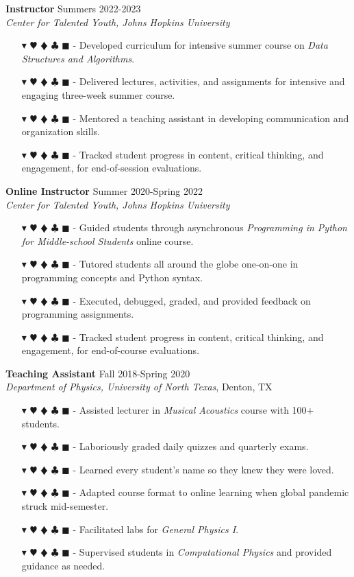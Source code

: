 \documentclass[overlapped, 10pt]{res} %
\newcommand{\physics}{$\blacktriangledown$}
\newcommand{\biochem}{$\varheartsuit$}
\newcommand{\shannon}{$\vardiamondsuit$}
\newcommand{\classic}{$\clubsuit$}
\newcommand{\quantum}{$\blacksquare$}
\newcommand{\physicscolor}{\color{YellowOrange}}
\newcommand{\biochemcolor}{\color{Emerald}}
\newcommand{\shannoncolor}{\color{Goldenrod}}
\newcommand{\classiccolor}{\color{Cyan}}
\newcommand{\quantumcolor}{\color{RedOrange}}
\newcommand{\tag}[1]{
    {\IfSubStr{#1}{\physics}{\physicscolor}{\color{White}}\physics}
    {\IfSubStr{#1}{\biochem}{\biochemcolor}{\color{White}}\biochem}
    {\IfSubStr{#1}{\shannon}{\shannoncolor}{\color{White}}\shannon}
    {\IfSubStr{#1}{\classic}{\classiccolor}{\color{White}}\classic}
    {\IfSubStr{#1}{\quantum}{\quantumcolor}{\color{White}}\quantum}
}
\begin{document}
\begin{resume}
\textbf{Instructor} \hfill Summers 2022-2023 \\
\textit{Center for Talented Youth, Johns Hopkins University}
\begin{itemize} \itemsep -2pt %
\item[\tag{\classic}-] Developed curriculum for intensive summer course on \textit{Data Structures and Algorithms}.
\item[\tag{\classic}-] Delivered lectures, activities, and assignments for intensive and engaging three-week summer course.
\item[\tag{}-] Mentored a teaching assistant in developing communication and organization skills.
\item[\tag{}-] Tracked student progress in content, critical thinking, and engagement, for end-of-session evaluations.
\end{itemize}

\textbf{Online Instructor} \hfill Summer 2020-Spring 2022 \\
\textit{Center for Talented Youth, Johns Hopkins University}
\begin{itemize} \itemsep -2pt %
\item[\tag{\classic}-] Guided students through asynchronous \textit{Programming in Python for Middle-school Students} online course.
\item[\tag{\classic}-] Tutored students all around the globe one-on-one in programming concepts and Python syntax.
\item[\tag{\classic}-] Executed, debugged, graded, and provided feedback on programming assignments.
\item[\tag{}-] Tracked student progress in content, critical thinking, and engagement, for end-of-course evaluations.
\end{itemize}

\textbf{Teaching Assistant} \hfill Fall 2018-Spring 2020 \\
\textit{Department of Physics, University of North Texas}, Denton, TX
\begin{itemize} \itemsep -2pt %
\item[\tag{\physics}-] Assisted lecturer in \textit{Musical Acoustics} course with 100+ students.
\item[\tag{}-] Laboriously graded daily quizzes and quarterly exams.
\item[\tag{}-] Learned every student's name so they knew they were loved.
\item[\tag{}-] Adapted course format to online learning when global pandemic struck mid-semester.
\item[\tag{\physics}-] Facilitated labs for \textit{General Physics I}.
\item[\tag{\physics\classic}-] Supervised students in \textit{Computational Physics} and provided guidance as needed.
\end{itemize}


\end{resume}
\end{document}

